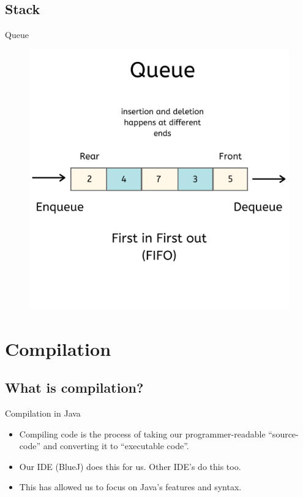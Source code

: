 \documentclass[table,xcolor=table]{IFMG-beamer}
\begin{document}
\subsection{Stack}
\begin{frame}{Queue}
  \begin{figure}
    \centering
    \includegraphics[width=0.8\linewidth]{figs/queue.png}
  \end{figure}
\end{frame}

\section{Compilation}
\subsection{What is compilation?}
\begin{frame}{Compilation in Java}
  \begin{itemize}
    \item Compiling code is the process of taking our programmer-readable ``source-code'' and converting it to ``executable code''.
    \item Our IDE (BlueJ) does this for us. Other IDE's do this too.
    \item This has allowed us to focus on Java's features and syntax.
  \end{itemize}
\end{frame}
\end{document}
